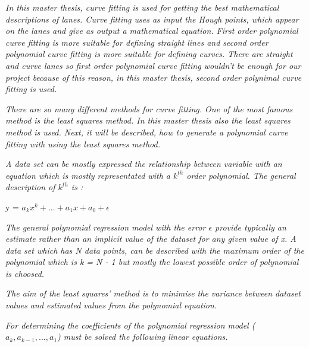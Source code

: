 \emph{\color{blue}In this master thesis, curve fitting is used for getting the best mathematical descriptions of lanes. Curve fitting uses as input the Hough points, which appear on the lanes and give as output a mathematical equation. First order polynomial curve fitting is more suitable for defining straight lines and second order polynomial curve fitting is more suitable for defining curves. There are straight and curve lanes so first order polynomial curve fitting wouldn't be enough for our project because of this reason, in this master thesis, second order polynimal curve fitting is used.}

\emph{\color{blue}There are so many different methods for curve fitting. One of the most famous method is the least squares method. In this master thesis also the least squares method is used. Next, it will be described, how to generate a polynomial curve fitting with using the least squares method.}

\emph{\color{blue}A data set can be mostly expressed the relationship between variable with an equation which is mostly representated with a $k^{th}$ order polynomial. The general description of $ k^{th} $ is :}

\begin{center}
y = $ a_{k}x^{k} + ... + a_{1}x + a_{0} + \epsilon $ 
\end{center}

\emph{\color{blue}The general polynomial regression model with the error $\epsilon$ provide typically an estimate rather than an implicit value of the dataset for any given value of x. A data set which has N data points, can be described with the maximum order of the polynomial which is k = N - 1 but mostly the lowest possible order of polynomial is choosed.}

\emph{\color{blue} The aim of the least squares' method is to minimise the variance between dataset values and estimated values from the polynomial equation.}

\emph{\color{blue} For determining the coefficients of the polynomial regression model ($ a_{k}, a_{k-1}, ..., a_{1} $) must be solved the following linear equations.}

